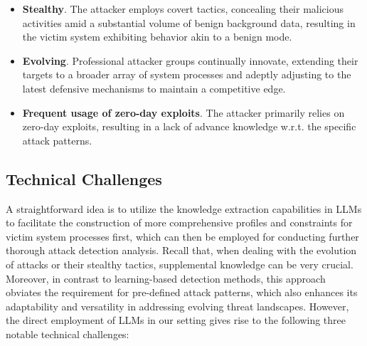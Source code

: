\begin{itemize}
    \item \textbf{Stealthy}. The attacker employs covert tactics, concealing their malicious activities amid a substantial volume of benign background data, resulting in the victim system exhibiting behavior akin to a benign mode.
    \item \textbf{Evolving}. Professional attacker groups continually innovate, extending their targets to a broader array of system processes and adeptly adjusting to the latest defensive mechanisms to maintain a competitive edge.
    \item \textbf{Frequent usage of zero-day exploits}. The attacker primarily relies on zero-day exploits, resulting in a lack of advance knowledge w.r.t. the specific attack patterns.
\end{itemize}

\subsection{Technical Challenges}
A straightforward idea is to utilize the knowledge extraction capabilities in LLMs to facilitate the construction of more comprehensive profiles and constraints for victim system processes first, which can then be employed for conducting further thorough attack detection analysis. Recall that,
when dealing with the evolution of attacks or their stealthy tactics, supplemental knowledge can be very crucial. Moreover, in contrast to learning-based detection methods, this approach obviates the requirement for pre-defined attack patterns, which also enhances its adaptability and versatility in addressing evolving threat landscapes.
However, the direct employment of LLMs in our setting gives rise to the following three notable technical challenges:



